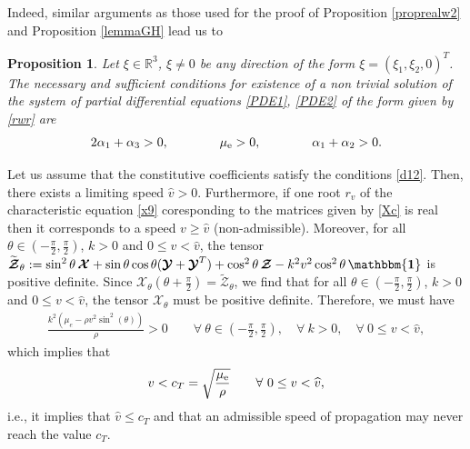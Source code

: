 \documentclass[10pt]{article}
\newcommand{\id}{{\mathbf{\mathbbm{1}}}}
\newtheorem{proposition}[theorem]{Proposition}
\begin{document}
Indeed, similar arguments as those used for the proof of  Proposition \ref{proprealw2} and Proposition \ref{lemmaGH} lead us to
\begin{proposition}\label{proprealw2c} Let   ${\xi}\in \mathbb{R}^3$, $\xi\neq 0$ be any direction of the form $\xi=(\xi_1,\xi_2, 0)^T$. The necessary and sufficient conditions for existence of   a non trivial solution of the system of partial differential equations \eqref{PDE1}, \eqref{PDE2}  of the form given by \eqref{rwr} are 
	\begin{align}\label{d12f}
		2\alpha_1+\alpha_3 >0,\qquad \qquad \mu_{\rm e} >0,\qquad \qquad   \alpha_1+\alpha_2>0.
	\end{align}
\end{proposition}
Let  {us} assume that  the constitutive coefficients satisfy the conditions 	\eqref{d12}. Then, there	exists a limiting speed $\widehat{v}>0$. Furthermore,   if one root   $r_v$ of the characteristic equation \eqref{x9} coresponding to the matrices given by \eqref{Xc} is real then it corresponds to a speed $v\geq \widehat{v}$ (non-admissible).
	Moreover,  for all $\theta\in \left(-\frac{\pi}{2},\frac{\pi}{2}\right)$, $k>0$ and $0\le v<\widehat{v}$, the tensor $\widetilde{\boldsymbol{\mathcal{Z}}}_\theta:=\sin^2\theta\,\boldsymbol{\mathcal{X}}+\sin\theta\cos\theta (\boldsymbol{\mathcal{Y}}+\boldsymbol{\mathcal{Y}}^T)+\cos^2\theta\,\boldsymbol{\mathcal{Z}}-k^2 v^2 \cos^2\theta \,{\id}$ is positive definite. Since $ \boldsymbol{\mathcal{X}}_{\!\! \theta}(\theta+\frac{\pi}{2})=\widetilde{\boldsymbol{\mathcal{Z}}}_\theta$, we find that for all $\theta\in \left(-\frac{\pi}{2},\frac{\pi}{2}\right)$, $k>0$ and $0\le v<\widehat{v}$, the tensor ${\boldsymbol{\mathcal{X}}}_\theta$ must be positive definite.   Therefore, we must have
	\begin{align}
		\frac{k^2 \left(\mu _e-\rho  v^2 \sin ^2(\theta )\right)}{\rho }>0\qquad \forall \ \theta\in \left(-\frac{\pi}{2},\frac{\pi}{2}\right), \quad \forall\  k>0,\quad \forall \ 0\le v<\widehat{v},
	\end{align}
	which implies that
	\begin{align}
		v<c_T=\sqrt{\frac{\mu_{\rm e}}{\rho}}\qquad \forall \ 0\le v<\widehat{v},
	\end{align}
	i.e., it implies that 	$\widehat{v}\leq c_T$ and that an admissible speed of propagation may never reach the value $c_T$.
	
	
\end{document}
